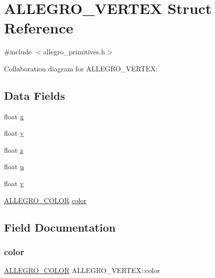 \hypertarget{struct_a_l_l_e_g_r_o___v_e_r_t_e_x}{}\section{A\+L\+L\+E\+G\+R\+O\+\_\+\+V\+E\+R\+T\+EX Struct Reference}
\label{struct_a_l_l_e_g_r_o___v_e_r_t_e_x}


{\ttfamily \#include $<$allegro\+\_\+primitives.\+h$>$}



Collaboration diagram for A\+L\+L\+E\+G\+R\+O\+\_\+\+V\+E\+R\+T\+EX\+:
\subsection*{Data Fields}
\begin{DoxyCompactItemize}
\item 
float \hyperlink{struct_a_l_l_e_g_r_o___v_e_r_t_e_x_a669ecbfb8a90ca3c4da797229c404371}{x}
\item 
float \hyperlink{struct_a_l_l_e_g_r_o___v_e_r_t_e_x_aaae039d8e501e177d0bb00eba4dd8653}{y}
\item 
float \hyperlink{struct_a_l_l_e_g_r_o___v_e_r_t_e_x_a206b126f2ab8cf9ce022b72cb27b6921}{z}
\item 
float \hyperlink{struct_a_l_l_e_g_r_o___v_e_r_t_e_x_a014ba8a25fff1d79c2ad4f8cb51c3e6b}{u}
\item 
float \hyperlink{struct_a_l_l_e_g_r_o___v_e_r_t_e_x_a0ce40faef7fef55e9d2afb649de63e05}{v}
\item 
\hyperlink{struct_a_l_l_e_g_r_o___c_o_l_o_r}{A\+L\+L\+E\+G\+R\+O\+\_\+\+C\+O\+L\+OR} \hyperlink{struct_a_l_l_e_g_r_o___v_e_r_t_e_x_a162c4d6360625cbc5c8d0a02053b4f46}{color}
\end{DoxyCompactItemize}


\subsection{Field Documentation}
\mbox{\label{struct_a_l_l_e_g_r_o___v_e_r_t_e_x_a162c4d6360625cbc5c8d0a02053b4f46}} 
\subsubsection{\texorpdfstring{color}{color}}
{\footnotesize\ttfamily \hyperlink{struct_a_l_l_e_g_r_o___c_o_l_o_r}{A\+L\+L\+E\+G\+R\+O\+\_\+\+C\+O\+L\+OR} A\+L\+L\+E\+G\+R\+O\+\_\+\+V\+E\+R\+T\+E\+X\+::color}

